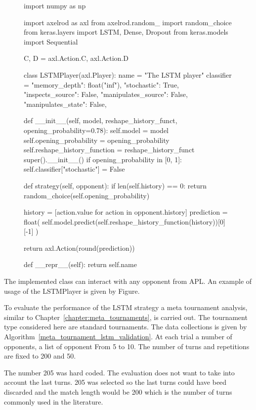 \begin{figure}[!htbp]
\begin{sourcepy}
import numpy as np

import axelrod as axl
from axelrod.random_ import random_choice
from keras.layers import LSTM, Dense, Dropout
from keras.models import Sequential

C, D = axl.Action.C, axl.Action.D


class LSTMPlayer(axl.Player):
    name = "The LSTM player"
    classifier = {
        "memory_depth": float("inf"),
        "stochastic": True,
        "inspects_source": False,
        "manipulates_source": False,
        "manipulates_state": False,
    }

    def __init__(self, model, reshape_history_funct, opening_probability=0.78):
        self.model = model
        self.opening_probability = opening_probability
        self.reshape_history_function = reshape_history_funct
        super().__init__()
        if opening_probability in [0, 1]:
            self.classifier["stochastic"] = False

    def strategy(self, opponent):
        if len(self.history) == 0:
            return random_choice(self.opening_probability)

        history = [action.value for action in opponent.history]
        prediction = float(
            self.model.predict(self.reshape_history_function(history))[0][-1]
        )

        return axl.Action(round(prediction))

    def __repr__(self):
        return self.name
\end{sourcepy}
\end{figure}

The implemented class can interact with any opponent from APL.
An example of usage of the LSTMPlayer is given by Figure.

To evaluate the performance of the LSTM strategy a meta tournament analysis,
similar to Chapter~\ref{chapter:meta_tournaments}, is carried out. The
tournament type considered here are standard tournaments. The data collections
is given by Algorithm~\ref{meta_tournament_lstm_validation}. At each trial
a number of opponents, a list of opponent From 5 to 10. The number of turns and repetitions
are fixed to 200 and 50.

The number 205 was hard coded. The evaluation does not want to take into account
the last turns. 205 was selected so the last turns could have beed discarded
and the match length would be 200 which is the number of turns commonly used
in the literature.

